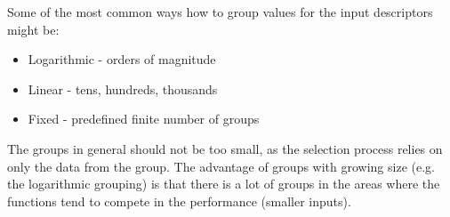 
Some of the most common ways how to group values for the input descriptors might be:
\begin{itemize}
	\item Logarithmic - orders of magnitude
	\item Linear - tens, hundreds, thousands
	\item Fixed - predefined finite number of groups
\end{itemize}

The groups in general should not be too small, as the selection process relies on only the data from the group. The advantage of groups with growing size (e.g. the logarithmic grouping) is that there is a lot of groups in the areas where the functions tend to compete in the performance (smaller inputs).